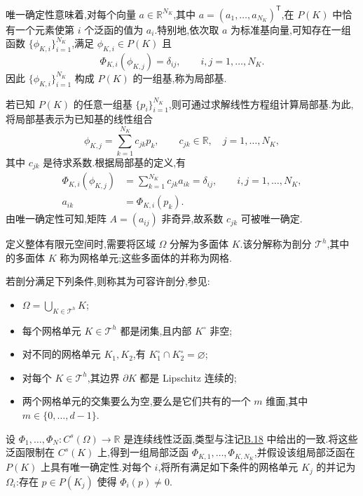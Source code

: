 \begin{note}[局部基函数]\label{note:appendix-b-20}
唯一确定性意味着,对每个向量 $a\in\mathbb R^{N_K}$,其中
$a=(a_1,\ldots,a_{N_K})^{\mathsf T}$,在 $P(K)$ 中恰有一个元素使第 $i$ 个泛函的值为 $a_i$.特别地,依次取 $a$ 为标准基向量,可知存在一组函数
$\{\phi_{K,i}\}_{i=1}^{N_K}$,满足 $\phi_{K,i}\in P(K)$ 且
\[
 \Phi_{K,i}(\phi_{K,j})=\delta_{ij},
 \qquad i,j=1,\ldots,N_K.
\]
因此 $\{\phi_{K,i}\}_{i=1}^{N_K}$ 构成 $P(K)$ 的一组基,称为局部基.
\end{note}

\begin{note}[任意基向局部基的转换]\label{note:appendix-b-21}
若已知 $P(K)$ 的任意一组基 $\{p_i\}_{i=1}^{N_K}$,则可通过求解线性方程组计算局部基.为此,将局部基表示为已知基的线性组合
\[
 \phi_{K,j}=\sum_{k=1}^{N_K}c_{jk}p_k,\qquad
 c_{jk}\in\mathbb R,\quad j=1,\ldots,N_K,
\]
其中 $c_{jk}$ 是待求系数.根据局部基的定义,有
\[
\begin{aligned}
\Phi_{K,i}(\phi_{K,j})
 &=\sum_{k=1}^{N_K}c_{jk}a_{ik}
 =\delta_{ij},\qquad i,j=1,\ldots,N_K,\\
 a_{ik}&=\Phi_{K,i}(p_k).
\end{aligned}
\]
由唯一确定性可知,矩阵 $A=(a_{ij})$ 非奇异,故系数 $c_{jk}$ 可被唯一确定.
\end{note}

\begin{note}[剖分、网格与网格单元]\label{note:appendix-b-22}
定义整体有限元空间时,需要将区域 $\Omega$ 分解为多面体 $K$.该分解称为剖分 $\mathcal T^h$,其中的多面体 $K$ 称为网格单元;这些多面体的并称为网格.

若剖分满足下列条件,则称其为可容许剖分,参见\textcite[第 38、51 页]{Ciarlet1978}:
\begin{itemize}
 \item $\Omega=\bigcup_{K\in\mathcal T^h}K$;
 \item 每个网格单元 $K\in\mathcal T^h$ 都是闭集,且内部 $K^\circ$ 非空;
 \item 对不同的网格单元 $K_1,K_2$,有 $K_1^\circ\cap K_2^\circ=\varnothing$;
 \item 对每个 $K\in\mathcal T^h$,其边界 $\partial K$ 都是 Lipschitz 连续的;
 \item 两个网格单元的交集要么为空,要么是它们共有的一个 $m$ 维面,其中 $m\in\{0,\ldots,d-1\}$.
\end{itemize}
\end{note}

\begin{note}[整体泛函与局部泛函]\label{note:appendix-b-23}
设 $\Phi_1,\ldots,\Phi_N:C^s(\Omega)\to\mathbb R$ 是连续线性泛函,类型与注记\hyperref[note:appendix-b-18]{B.18} 中给出的一致.将这些泛函限制在 $C^s(K)$ 上,得到一组局部泛函
$\Phi_{K,1},\ldots,\Phi_{K,N_K}$,并假设该组局部泛函在 $P(K)$ 上具有唯一确定性.对每个 $i$,将所有满足如下条件的网格单元 $K_j$ 的并记为 $\Omega_i$:存在 $p\in P(K_j)$ 使得 $\Phi_i(p)\ne0$.
\end{note}

